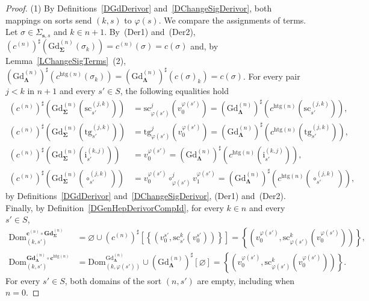 \documentclass[a4paper, reqno]{amsbook}
\newcommand{\sig}[1]{\mathbf{#1}}             %
\newcommand{\Dom}{\mathrm{Dom}}
\newcommand{\htg}{\mathrm{htg}}                %
\newcommand{\src}{\mathrm{sc}}
\newcommand{\tgt}{\mathrm{tg}}
\newcommand{\Gd}{\mathrm{Gd}}
\newcommand{\bGd}{\mathbf{Gd}}
\theoremstyle{plain}
\theoremstyle{definition}
\begin{document}
\begin{proof}
(1) By Definitions~\ref{DGdDerivor} and~\ref{DChangeSigDerivor}, both mappings on sorts send $(k,s)$ to $\varphi(s)$.
We compare the assignments of terms.
Let $\sigma\in\Sigma_{\mathbf{s},s}$ and $k\in n+1$.
By~(Der1) and~(Der2), $(c^{(n)})^{\sharp}(\Gd^{(n)}_{\sig{\Sigma}}(\sigma_{k}))=c^{(n)}(\sigma)=c(\sigma)$ and, by Lemma~\ref{LChangeSigTerms}~(2), $(\Gd^{(n)}_{\sig{\Lambda}})^{\sharp}(c^{\htg(n)}(\sigma_{k}))=(\Gd^{(n)}_{\sig{\Lambda}})^{\sharp}(c(\sigma)_{k})=c(\sigma)$.
For every pair $j<k$ in $n+1$ and every $s'\in S$, the following equalities hold
\begin{align*}
(c^{(n)})^{\sharp}\left(\Gd^{(n)}_{\sig{\Sigma}}(\src^{(j,k)}_{s'})\right)
&=
\src^{j}_{\varphi(s')}\left(v^{\varphi(s')}_{0}\right)
=
(\Gd^{(n)}_{\sig{\Lambda}})^{\sharp}\left(c^{\htg(n)}(\src^{(j,k)}_{s'})\right),
\\
(c^{(n)})^{\sharp}\left(\Gd^{(n)}_{\sig{\Sigma}}(\tgt^{(j,k)}_{s'})\right)
&=
\tgt^{j}_{\varphi(s')}\left(v^{\varphi(s')}_{0}\right)
=
(\Gd^{(n)}_{\sig{\Lambda}})^{\sharp}\left(c^{\htg(n)}(\tgt^{(j,k)}_{s'})\right),
\\
(c^{(n)})^{\sharp}\left(\Gd^{(n)}_{\sig{\Sigma}}(\mathrm{i}^{(k,j)}_{s'})\right)
&=
v^{\varphi(s')}_{0}
=
(\Gd^{(n)}_{\sig{\Lambda}})^{\sharp}\left(c^{\htg(n)}(\mathrm{i}^{(k,j)}_{s'})\right),
\\
(c^{(n)})^{\sharp}\left(\Gd^{(n)}_{\sig{\Sigma}}(\circ^{(j,k)}_{s'})\right)
&=
v^{\varphi(s')}_{0}\circ^{j}_{\varphi(s')}v^{\varphi(s')}_{1}
=
(\Gd^{(n)}_{\sig{\Lambda}})^{\sharp}\left(c^{\htg(n)}(\circ^{(j,k)}_{s'})\right),
\end{align*}
by Definitions~\ref{DGdDerivor} and~\ref{DChangeSigDerivor}, (Der1) and~(Der2).
Finally, by Definition~\ref{DGenHepDerivorCompId}, for every $k\in n$ and every $s'\in S$,
\begin{align*}
\Dom^{\mathbf{c}^{(n)}\circ\bGd^{(n)}_{\sig{\Sigma}}}_{(k,s')}
&=
\varnothing\cup(c^{(n)})^{\sharp}\left[\left\lbrace\left(v^{s'}_{0},\src^{k}_{s'}(v^{s'}_{0})\right)\right\rbrace\right]
=
\left\lbrace\left(v^{\varphi(s')}_{0},\src^{k}_{\varphi(s')}(v^{\varphi(s')}_{0})\right)\right\rbrace,
\\
\Dom^{\bGd^{(n)}_{\sig{\Lambda}}\circ\mathbf{c}^{\htg(n)}}_{(k,s')}
&=
\Dom^{\Gd^{(n)}_{\sig{\Lambda}}}_{(k,\varphi(s'))}\cup(\Gd^{(n)}_{\sig{\Lambda}})^{\sharp}[\varnothing]
=
\left\lbrace\left(v^{\varphi(s')}_{0},\src^{k}_{\varphi(s')}(v^{\varphi(s')}_{0})\right)\right\rbrace.
\end{align*}
For every $s'\in S$, both domains of the sort $(n,s')$ are empty, including when $n=0$.


\end{proof}
\end{document}
